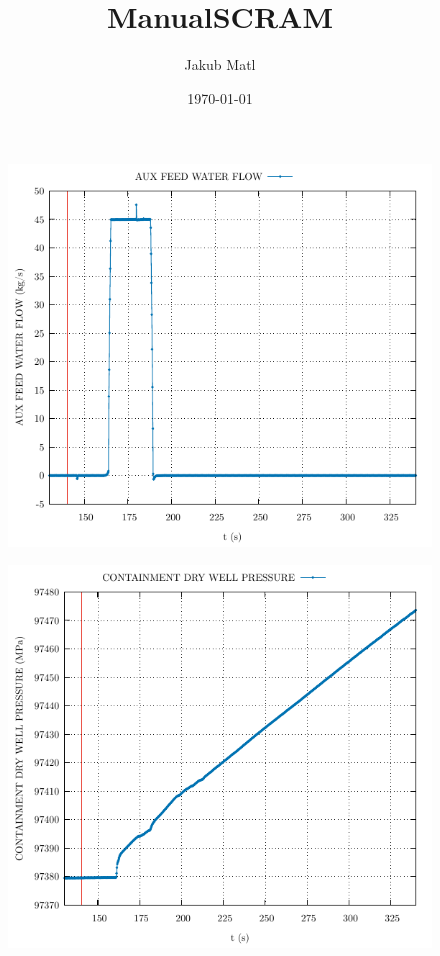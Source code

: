 \documentclass{article}
\title{ManualSCRAM}
\author{Jakub Matl}
\date{\today}
\begin{document}
\maketitle
\begin{multicols}{2}
\begin{figure}[H]
\centering
\includegraphics[width=\linewidth]{./graphs/AUX FEED WATER FLOW_comp.pdf}
\end{figure}
\begin{figure}[H]
\centering
\includegraphics[width=\linewidth]{./graphs/CONTAINMENT DRY WELL PRESSURE_comp.pdf}

\end{figure}
\end{multicols}
\end{document}
